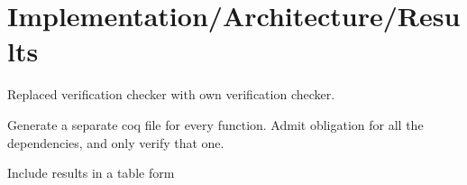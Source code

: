 \section{Implementation/Architecture/Results}

Replaced verification checker with own verification checker.

Generate a separate coq file for every function. Admit obligation for all the dependencies, and only verify that one.

Include results in a table form